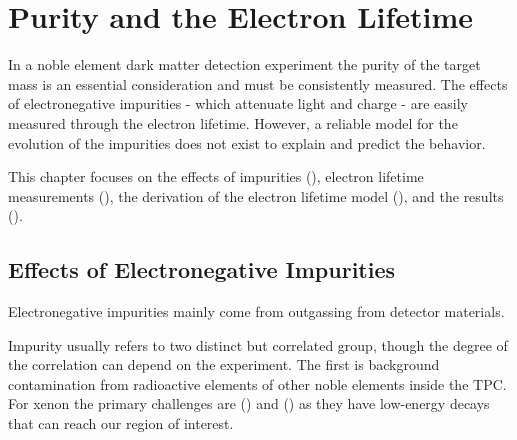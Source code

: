

\pagestyle{cu}
\graphicspath{{./Chapter5/Figures/}}
\chapter[Purity and the Electron Lifetime][Purity and the Electron Lifetime]{Purity and the Electron Lifetime}
\label{chap:purification}

In a noble element dark matter detection experiment the purity of the target mass is an essential consideration and must be consistently
measured.  The effects of electronegative impurities - which attenuate light and charge - are easily measured through the electron
lifetime.  However, a reliable model for the evolution of the impurities does not exist to explain and predict the behavior.

This chapter focuses on the effects of impurities (), electron lifetime measurements
(), the derivation of the electron lifetime model (), and
the results ().



\section{Effects of Electronegative Impurities}
\label{sec:importance_procedure_effects}
Electronegative impurities mainly come from outgassing from detector materials.

Impurity usually refers to two distinct but correlated group, though the degree of the correlation can depend on the
experiment.  The first is background contamination from radioactive elements of other noble elements inside the TPC.  For xenon
the primary challenges are  () and 
() as they have low-energy decays that can reach our region of interest.

